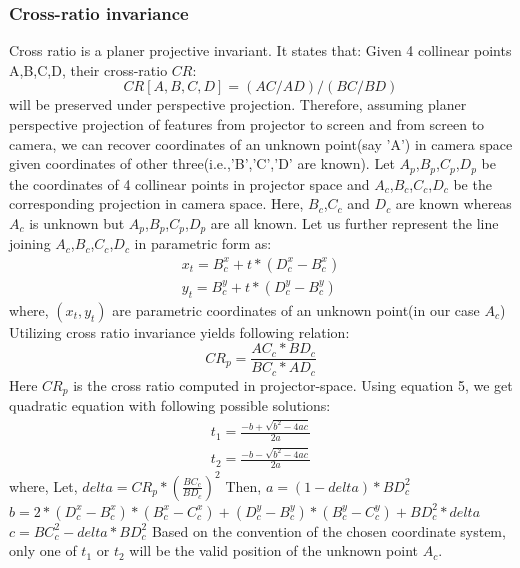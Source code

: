 \documentclass{article}
\begin{document}
\subsubsection{Cross-ratio invariance}
  Cross ratio is a planer projective invariant. It states that: Given 4 collinear points A,B,C,D, their cross-ratio $CR$:
\begin{equation} 
CR[A,B,C,D]=(AC/AD)/(BC/BD)
\end{equation}
will be preserved under perspective projection. Therefore, assuming planer perspective projection of features from projector to screen and from screen to camera, we can recover coordinates of an unknown point(say 'A') in camera space given coordinates of other three(i.e.,'B','C','D' are known). \newline \newline
Let $A_p$,$B_p$,$C_p$,$D_p$ be the coordinates of 4 collinear points in projector space and $A_c$,$B_c$,$C_c$,$D_c$ be the corresponding projection in camera space. Here, $B_c$,$C_c$ and $D_c$ are known whereas $A_c$ is unknown but $A_p$,$B_p$,$C_p$,$D_p$ are all known. Let us further represent the line joining $A_c$,$B_c$,$C_c$,$D_c$ in parametric form as:
\begin{equation}
\begin{aligned}
x_t=B_c^x+t*(D_c^x-B_c^x)\\
y_t=B_c^y+t*(D_c^y-B_c^y)
\end{aligned}
\label{paramet}
\end{equation}
where, $(x_t,y_t)$ are parametric coordinates of an unknown point(in our case $A_c$)\newline
Utilizing cross ratio invariance yields following relation:
\begin{equation}
CR_p=\frac{AC_c*BD_c}{BC_c*AD_c}
\end{equation}
Here $CR_p$ is the cross ratio computed in projector-space. Using equation 5, we get quadratic equation with following possible solutions:
\begin{equation}
\begin{aligned}
t_1=\frac{-b+\sqrt{b^{2}-4ac}}{2a}\\
t_2=\frac{-b-\sqrt{b^{2}-4ac}}{2a}
\end{aligned}
\end{equation}
where,\newline
Let,\newline
$delta={CR_p*(\frac{BC_c}{BD_c})}^2$\newline
Then,\newline
$a=(1-delta)*BD_c^2$\newline
$b=2*{(D_c^x-B_c^x)*(B_c^x-C_c^x)+(D_c^y-B_c^y)*(B_c^y-C_c^y)+BD_c^{2}*delta}$\newline
$c=BC_c^2-delta*BD_c^2$
\newline \newline
Based on the convention of the chosen coordinate system, only one of $t_1$ or $t_2$ will be the valid position of the unknown point $A_c$.
\end{document}
